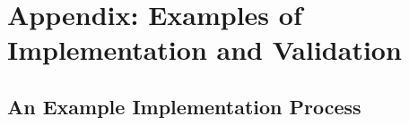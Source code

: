 \documentclass[DM,lsstdraft,toc]{lsstdoc}
\begin{document}

\clearpage
\section{Appendix: Examples of Implementation and Validation}\label{sec:imp}

\subsection{An Example Implementation Process}\label{ssec:imp_imp}
\end{document}
